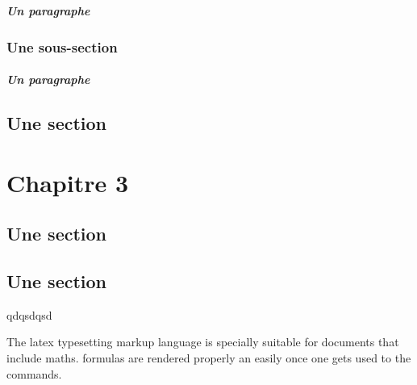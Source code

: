 \documentclass{book}
\begin{document}
                \paragraph{Un paragraphe}
            \subsection{Une sous-section}
                \paragraph{Un paragraphe}
        \section{Une section}
    \chapter{Chapitre 3}
        \section{Une section}
        \section{Une section}
      
  qdqsdqsd  

The \Gls{latex} typesetting markup language is specially suitable 
for documents that include \gls{maths}. \Glspl{formula} are rendered 
properly an easily once one gets used to the commands.

\printglossary[type=\acronymtype]

\printglossary[nonumberlist]
\end{document}
